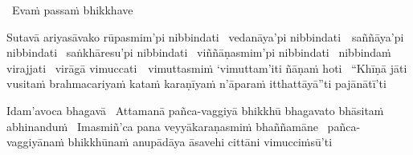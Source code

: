 \begin{leader-pali}
  \anglebracketleft\ \hspace{-0.5mm}Evaṁ passaṁ bhikkhave \hspace{-0.5mm}\anglebracketright\
\end{leader-pali}
\begin{pali-hang-together}
  Sutavā ariyasāvako rūpasmim'pi nibbindati \breathmark\ vedanāya'pi \mbox{nibbindati}~\breathmark\ saññāya'pi nibbindati \breathmark\ saṅkhāresu'pi nibbindati \breathmark\ viññāṇasmim'pi nibbindati \breathmark\ nibbindaṁ virajjati \breathmark\ virāgā \mbox{vimuccati}~\breathmark\ vimuttasmiṁ `vimuttam'iti ñāṇaṁ hoti \breathmark\ ``Khīṇā jāti vusitaṁ brahmacariyaṁ kataṁ karaṇīyaṁ n'āparaṁ itthattāyā''ti pajānātī'ti
\end{pali-hang-together}

\ifafiveversion\clearpage\fi

\begin{pali-hang}
  Idam'avoca bhagavā \breathmark\ Attamanā pañca-vaggiyā bhikkhū bhagavato bhāsitaṁ abhinanduṁ \breathmark\ Imasmiñ'ca pana veyyākaraṇasmiṁ bhaññamāne \breathmark\ pañca-vaggiyānaṁ bhikkhūnaṁ anupādāya āsavehi cittāni vimucciṁsū'ti
\end{pali-hang}

\suttaRef{[SN 22.59]}

\ifdigitalversion{}\fi
